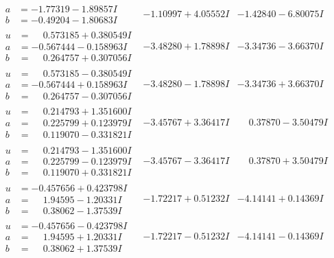 \documentclass[1p]{elsarticle_modified}
\theoremstyle{definition}
\begin{document}
$$\begin{array}{c|c|c}
\begin{aligned}
a &= -1.77319 - 1.89857 I \\
b &= -0.49204 - 1.80683 I\end{aligned}
 & -1.10997 + 4.05552 I & -1.42840 - 6.80075 I \\ \hline\begin{aligned}
u &= \phantom{-}0.573185 + 0.380549 I \\
a &= -0.567444 - 0.158963 I \\
b &= \phantom{-}0.264757 + 0.307056 I\end{aligned}
 & -3.48280 + 1.78898 I & -3.34736 - 3.66370 I \\ \hline\begin{aligned}
u &= \phantom{-}0.573185 - 0.380549 I \\
a &= -0.567444 + 0.158963 I \\
b &= \phantom{-}0.264757 - 0.307056 I\end{aligned}
 & -3.48280 - 1.78898 I & -3.34736 + 3.66370 I \\ \hline\begin{aligned}
u &= \phantom{-}0.214793 + 1.351600 I \\
a &= \phantom{-}0.225799 + 0.123979 I \\
b &= \phantom{-}0.119070 - 0.331821 I\end{aligned}
 & -3.45767 + 3.36417 I & \phantom{-}0.37870 - 3.50479 I \\ \hline\begin{aligned}
u &= \phantom{-}0.214793 - 1.351600 I \\
a &= \phantom{-}0.225799 - 0.123979 I \\
b &= \phantom{-}0.119070 + 0.331821 I\end{aligned}
 & -3.45767 - 3.36417 I & \phantom{-}0.37870 + 3.50479 I \\ \hline\begin{aligned}
u &= -0.457656 + 0.423798 I \\
a &= \phantom{-}1.94595 - 1.20331 I \\
b &= \phantom{-}0.38062 - 1.37539 I\end{aligned}
 & -1.72217 + 0.51232 I & -4.14141 + 0.14369 I \\ \hline\begin{aligned}
u &= -0.457656 - 0.423798 I \\
a &= \phantom{-}1.94595 + 1.20331 I \\
b &= \phantom{-}0.38062 + 1.37539 I\end{aligned}
 & -1.72217 - 0.51232 I & -4.14141 - 0.14369 I \\ \hline\begin{aligned}

\end{aligned}
\end{array}$$
\end{document}
